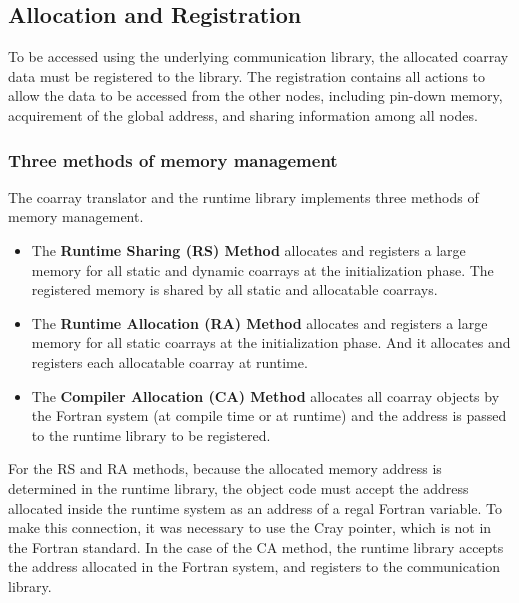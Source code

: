 \subsection{Allocation and Registration}\label{sec:alloc}

To be accessed using the underlying communication library,
the allocated coarray data must be registered to the library.
The registration contains all actions to allow the data to be accessed 
from the other nodes, including pin-down memory, acquirement of the global address,
and sharing information among all nodes.

\subsubsection{Three methods of memory management}

The coarray translator and the runtime library implements three methods of
memory management.
\begin{itemize}
\item
The {\bf Runtime Sharing (RS) Method} allocates and registers a large memory 
for all static and dynamic coarrays at the initialization phase.
The registered memory is shared by all static and allocatable coarrays. 

\item
The {\bf Runtime Allocation (RA) Method} allocates and registers a large memory
for all static coarrays at the initialization phase.
And it allocates and registers each allocatable coarray at runtime.

\item
The {\bf Compiler Allocation (CA) Method} allocates all coarray objects by 
the Fortran system (at compile time or at runtime) and the address is 
passed to the runtime library to be registered.
\end{itemize}

For the RS and RA methods, 
because the allocated memory address is determined in the runtime library, 
the object code must accept the address allocated 
inside the runtime system as an address of a regal Fortran variable.
To make this connection, it was necessary to use the Cray pointer, which is not 
in the Fortran standard.
In the case of the CA method, the runtime library accepts the address allocated
in the Fortran system, and registers to the communication library.

